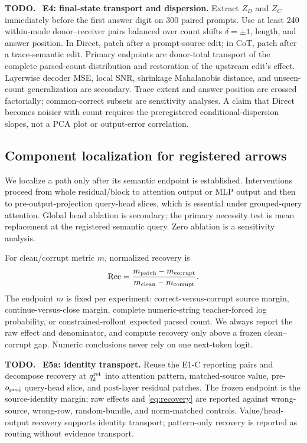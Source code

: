 \documentclass[11pt]{article}
\newenvironment{todobox}
  {\begin{center}\begin{minipage}{0.95\linewidth}\color{todored}\textbf{TODO.}~}
  {\end{minipage}\end{center}}
\begin{document}
\begin{todobox}
\textbf{E4: final-state transport and dispersion.} Extract $Z_D$ and $Z_C$ immediately before the first answer digit on 300 paired prompts. Use at least 240 within-mode donor--receiver pairs balanced over count shifts $\delta=\pm1$, length, and answer position. In Direct, patch after a prompt-source edit; in CoT, patch after a trace-semantic edit. Primary endpoints are donor-total transport of the complete parsed-count distribution and restoration of the upstream edit's effect. Layerwise decoder MSE, local SNR, shrinkage Mahalanobis distance, and unseen-count generalization are secondary. Trace extent and answer position are crossed factorially; common-correct subsets are sensitivity analyses. A claim that Direct becomes noisier with count requires the preregistered conditional-dispersion slopes, not a PCA plot or output-error correlation.
\end{todobox}

\subsection{Component localization for registered arrows}

We localize a path only after its semantic endpoint is established. Interventions proceed from whole residual/block to attention output or MLP output and then to pre-output-projection query-head slices, which is essential under grouped-query attention. Global head ablation is secondary; the primary necessity test is mean replacement at the registered semantic query. Zero ablation is a sensitivity analysis.

For clean/corrupt metric $m$, normalized recovery is
\begin{equation}
\operatorname{Rec}=
\frac{m_{\rm patch}-m_{\rm corrupt}}
{m_{\rm clean}-m_{\rm corrupt}}.
\label{eq:recovery}
\end{equation}
The endpoint $m$ is fixed per experiment: correct-versus-corrupt source margin, continue-versus-close margin, complete numeric-string teacher-forced log probability, or constrained-rollout expected parsed count. We always report the raw effect and denominator, and compute recovery only above a frozen clean--corrupt gap. Numeric conclusions never rely on one next-token logit.

\begin{todobox}
\textbf{E5a: identity transport.} Reuse the E1-C reporting pairs and decompose recovery at $q_k^{\rm ret}$ into attention pattern, matched-source value, pre-$o_{\rm proj}$ query-head slice, and post-layer residual patches. The frozen endpoint is the source-identity margin; raw effects and \cref{eq:recovery} are reported against wrong-source, wrong-row, random-bundle, and norm-matched controls. Value/head-output recovery supports identity transport; pattern-only recovery is reported as routing without evidence transport.
\end{todobox}
\end{document}
